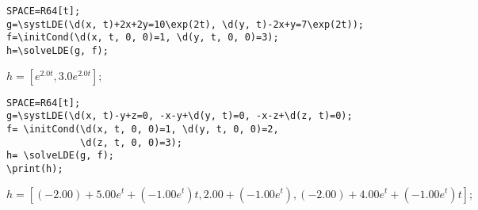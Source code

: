 \begin{verbatim}
SPACE=R64[t];
g=\systLDE(\d(x, t)+2x+2y=10\exp(2t), \d(y, t)-2x+y=7\exp(2t));
f=\initCond(\d(x, t, 0, 0)=1, \d(y, t, 0, 0)=3);
h=\solveLDE(g, f);  
\end{verbatim}

{$h = [e^{2.0t}, 3.0 e^{2.0t}];$}

\begin{verbatim}
SPACE=R64[t];
g=\systLDE(\d(x, t)-y+z=0, -x-y+\d(y, t)=0, -x-z+\d(z, t)=0);
f= \initCond(\d(x, t, 0, 0)=1, \d(y, t, 0, 0)=2, 
             \d(z, t, 0, 0)=3);
h= \solveLDE(g, f);  
\print(h);
\end{verbatim}

{$h = [(-2. 00)+5. 00 e^{t}+(-1. 00 e^{t}) t, 2. 00+(-1. 00 e^{t}), (-2. 00)+4. 00 e^{t}+(-1. 00 e^{t}) t];$}

